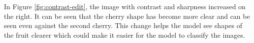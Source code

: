 \documentclass[../main.tex]{subfiles}
\begin{document}
In Figure \ref{fig:contrast-edit}, the image with contrast and sharpness increased on the right. It can be seen that the cherry shape has become more clear and can be seen even against the second cherry. This change helps the model see shapes of the fruit clearer which could make it easier for the model to classify the images. 
\end{document}
